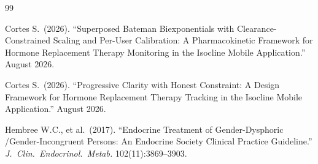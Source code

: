 \documentclass[11pt,a4paper]{article}
\begin{document}
\begin{thebibliography}{99}

Cortes S.\ (2026). ``Superposed Bateman Biexponentials with
Clearance-Constrained Scaling and Per-User Calibration: A Pharmacokinetic
Framework for Hormone Replacement Therapy Monitoring in the Isocline Mobile
Application.'' August 2026.

Cortes S.\ (2026). ``Progressive Clarity with Honest Constraint: A Design
Framework for Hormone Replacement Therapy Tracking in the Isocline Mobile
Application.'' August 2026.

Hembree W.C., et al.\ (2017). ``Endocrine Treatment of Gender-Dysphoric
/Gender-Incongruent Persons: An Endocrine Society Clinical Practice
Guideline.'' \emph{J.\ Clin.\ Endocrinol.\ Metab.} 102(11):3869--3903.

\end{thebibliography}
\end{document}
